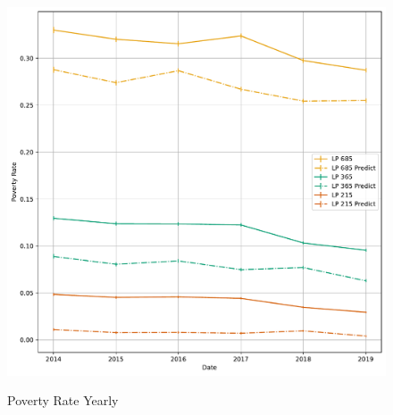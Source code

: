 \begin{figure}[H]
    \centering
    \caption{Poverty Rate Yearly}
    \includegraphics[width=\textwidth]{../figures/fig8_poverty_rate_time_series.pdf}
    \label{fig:enter-label}
\end{figure}




